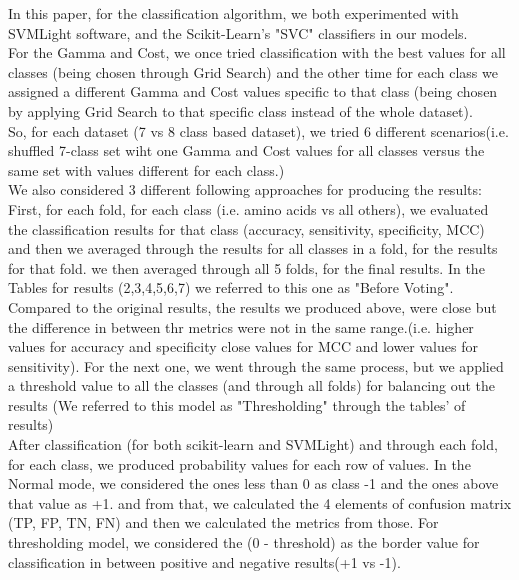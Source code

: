 
    In this paper, for the classification algorithm, we both experimented with SVMLight software, 
    and the Scikit-Learn's "SVC" classifiers in our models. \\

    For the Gamma and Cost, we once tried classification with
    the best values for all classes (being chosen through Grid Search) and the other time for 
    each class we assigned a different Gamma and Cost values specific to that class (being chosen by applying Grid Search to 
    that specific class instead of the whole dataset).\\

    So, for each dataset (7 vs 8 class based dataset), we tried 6 different 
    scenarios(i.e. shuffled 7-class set wiht one Gamma and Cost values for all classes versus the same set with values 
    different for each class.)\\

    We also considered 3 different following approaches for producing the results:\\ 
    First, for each fold, for each class (i.e. amino acids vs all others), we evaluated the classification 
    results for that class (accuracy, sensitivity, specificity, MCC) and then we averaged through the results for 
    all classes in a fold, for the results for that fold. we then averaged through all 5 folds, for the final results. In the 
    Tables for results (2,3,4,5,6,7) we referred to this one as "Before Voting".\\
    
    Compared to the original results, the results we produced above, were close but the difference in between thr metrics were not 
    in the same range.(i.e. higher values for accuracy and specificity close values for MCC and lower values for sensitivity). 
    For the next one, we went through the same process, but we applied a threshold value to all the classes (and through 
    all folds) for balancing out the results (We referred to this model as "Thresholding" through the tables' of results)\\

    After classification (for both scikit-learn and SVMLight) and through each fold, for each class, we produced probability values 
    for each row of values. In the Normal mode, we considered the ones less than 0 as class -1 and the ones above 
    that value as +1. and from that, we calculated the 4 elements of confusion matrix (TP, FP, TN, FN) and then we calculated the 
    metrics from those. For thresholding model, we considered the (0 - threshold) as the border value for classification in between 
    positive and negative results(+1 vs -1).\\

